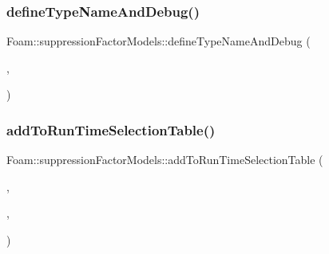 \subsubsection{\texorpdfstring{define\+Type\+Name\+And\+Debug()}{defineTypeNameAndDebug()}\hspace{0.1cm}{\footnotesize\ttfamily [2/2]}}
{\footnotesize\ttfamily Foam\+::suppression\+Factor\+Models\+::define\+Type\+Name\+And\+Debug (\begin{DoxyParamCaption}\item[{\hyperlink{classFoam_1_1suppressionFactorModels_1_1COBRA__TF}{C\+O\+B\+R\+A\+\_\+\+TF}}]{,  }\item[{0}]{ }\end{DoxyParamCaption})}

\mbox{\label{namespaceFoam_1_1suppressionFactorModels_a976a9052186d35f81e82dd534445c532}} 
\subsubsection{\texorpdfstring{add\+To\+Run\+Time\+Selection\+Table()}{addToRunTimeSelectionTable()}\hspace{0.1cm}{\footnotesize\ttfamily [2/2]}}
{\footnotesize\ttfamily Foam\+::suppression\+Factor\+Models\+::add\+To\+Run\+Time\+Selection\+Table (\begin{DoxyParamCaption}\item[{\hyperlink{classFoam_1_1suppressionFactorModel}{suppression\+Factor\+Model}}]{,  }\item[{\hyperlink{classFoam_1_1suppressionFactorModels_1_1COBRA__TF}{C\+O\+B\+R\+A\+\_\+\+TF}}]{,  }\item[{suppression\+Factor\+Models}]{ }\end{DoxyParamCaption})}

